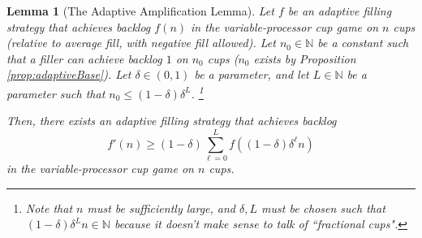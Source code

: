 \documentclass[twocolumn]{article}[10pt]
\newtheorem{lemma}{Lemma}
\begin{document}
\begin{lemma}[The Adaptive Amplification Lemma]\label{lem:adaptiveAmplification}
  Let $f$ be an adaptive filling strategy that achieves backlog $f(n)$ in the
  variable-processor cup game on $n$ cups (relative to average fill, with
  negative fill allowed).
  Let $n_0 \in \mathbb{N}$ be a constant such that a filler can achieve backlog $1$
  on $n_0$ cups ($n_0$ exists by Proposition \ref{prop:adaptiveBase}).
  Let $\delta\in(0,1)$ be a parameter, and let $L\in\mathbb{N}$ be a parameter
  such that $n_0 \le (1-\delta)\delta^L$.
  \footnote{Note that $n$ must be sufficiently large, and $\delta, L$ must be
  chosen such that $(1-\delta)\delta^L n \in \mathbb{N}$ because it doesn't
  make sense to talk of ``fractional cups".}

  Then, there exists an adaptive filling strategy that achieves backlog 
  $$f'(n) \ge (1-\delta)\sum_{\ell= 0}^{L} f((1-\delta)\delta^\ell n)$$
  in the variable-processor cup game on $n$ cups.
\end{lemma}
\end{document}
